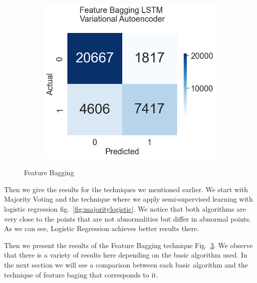 \documentclass[a4paper,12pt]{report}
\theoremstyle{definitionNODot}
\begin{document}
\begin{figure}[H]
\begin{subfigure}[b]{0.35\textwidth}
			\label{fig:anomaly_by_ensemble_ensemble_lstm_ae}
		\end{subfigure}
		\medskip
		\begin{subfigure}[b]{0.35\textwidth}
			\centering
			\includegraphics[width=\textwidth]{anomaly_by_ensemble_ensemble_lstm_vae.png}
			
			\label{fig:anomaly_by_ensemble_ensemble_lstm_vae}
		\end{subfigure}
		\caption{Feature Bagging}
		\label{fig:featurebaggingmodelsconfusion}
	\end{figure}
	
	Then we give the results for the techniques we mentioned earlier. We start with Majority Voting and the technique where we apply semi-supervised learning with logistic regression fig.~\ref{fig:majoritylogistic}. We notice that both algorithms are very close to the points that are not abnormalities but differ in abnormal points. As we can see, Logistic Regression achieves better results there.
	
	Then we present the results of the Feature Bagging technique Fig.~\ref{fig:featurebaggingmodelsconfusion}. We observe that there is a variety of results here depending on the basic algorithm used. In the next section we will see a comparison between each basic algorithm and the technique of feature baging that corresponds to it.
	
\end{document}
